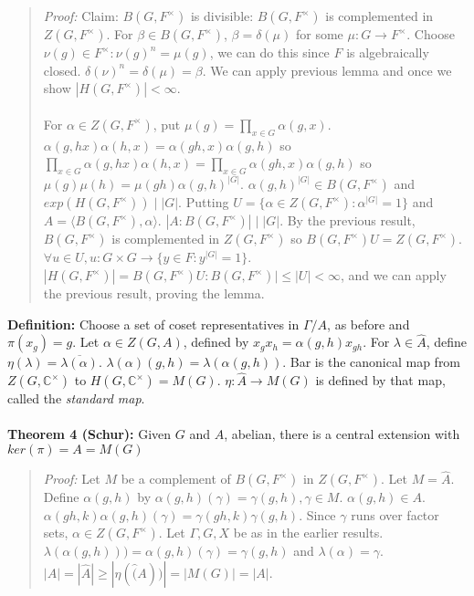 \begin{quote}
\emph{Proof:} 
Claim: $B(G, F^{\times})$ is divisible:
$B(G, F^{\times})$ is complemented in $Z(G, F^{\times})$.  For $\beta \in B(G, F^{\times})$, $\beta = \delta(\mu)$ for some
$\mu:G \rightarrow F^{\times}$.  Choose $\nu(g) \in F^{\times}: \nu(g)^n = \mu(g)$, we can do this since $F$ is algebraically closed.
$\delta(\nu)^n = \delta(\mu)= \beta$.  
We can apply previous lemma and once we show $|H(G, F^{\times})| < \infty$.\\
\\
For $\alpha \in Z(G, F^{\times})$, put
$\mu(g) = \prod_{x \in G} \alpha(g,x)$.
$\alpha(g, hx) \alpha(h, x) = \alpha(gh, x)\alpha(g, h)$ so
$\prod_{x \in G} \alpha(g, hx) \alpha(h, x) = \prod_{x \in G} \alpha(gh, x)\alpha(g, h)$ so
$\mu(g) \mu(h) = \mu(gh) \alpha(g, h)^{|G|}$.  $\alpha(g, h)^{|G|} \in B(G, F^{\times})$ and
$exp(H(G, F^{\times})) \mid |G|$.
Putting $U = \{ \alpha \in Z(G, F^{\times}): \alpha^{|G|} = 1 \}$ and $A = \langle B(G, F^{\times}), \alpha \rangle$.
$|A : B(G, F^{\times})| \mid |G|$.  By the previous result, $B(G, F^{\times})$ is complemented in $Z(G, F^{\times})$ so
$B(G, F^{\times})U = Z(G, F^{\times})$.   $\forall u \in U, u: G \times G \rightarrow \{y \in F: y^{|G|} = 1 \}$.
$|H(G, F^{\times})| = B(G, F^{\times})U:B(G, F^{\times})| \leq |U| < \infty$, and we can apply the previous result, proving the lemma.
\end{quote}
{\bf Definition:}  Choose a set of coset representatives in $\Gamma/A$, as before and $\pi(x_g) = g$.  Let
$\alpha \in Z(G, A)$, defined by $x_g x_h = \alpha(g,h) x_{gh}$.  For $\lambda \in \hat{A}$, define $\eta(\lambda) = {\overline {\lambda(\alpha)}}$.
$\lambda(\alpha)(g,h) = \lambda(\alpha(g,h))$.  Bar is the canonical map from $Z(G, {\mathbb C}^{\times})$ to $H(G, {\mathbb C}^{\times}) = M(G)$.
$\eta: \hat{A} \rightarrow M(G)$ is defined by that map, called the \emph{standard map}.
\\
\\
{\bf Theorem 4 (Schur):} Given $G$ and $A$, abelian, there is a central extension with $ker(\pi)=A= M(G)$
\begin{quote}
\emph{Proof:}
Let $M$ be a complement of $B(G, F^{\times})$ in $Z(G, F^{\times})$. Let $M = \hat{A}$.
Define $\alpha(g,h)$ by $\alpha(g, h)(\gamma) = \gamma(g,h), \gamma \in M$.  $\alpha(g,h) \in A$.
$\alpha(gh,k) \alpha(g,h) (\gamma) =  \gamma(gh, k) \gamma(g,h)$.  
Since $\gamma$ runs over factor sets, $\alpha \in Z(G, F^{\times})$.  Let $\Gamma, G, X$ be as in the earlier results.
$\lambda(\alpha(g,h))) = \alpha(g,h)(\gamma) = \gamma(g,h)$ and $\lambda(\alpha) = \gamma$.  
$|A| = |\hat{A}| \geq |\eta(\hat(A))| = |M(G)| = |A|$.
\end{quote}
